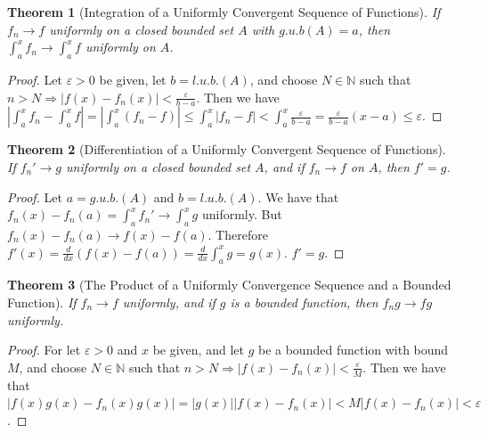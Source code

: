 \documentclass[12pt,oneside]{book}
\theoremstyle{mystyle}
\newtheorem{theorem}{Theorem}[section]
\begin{document}
\begin{theorem}[Integration of a Uniformly Convergent Sequence of Functions] If $f_n\rightarrow f$ uniformly on a closed bounded set $A$ with $g.u.b(A)=a$, then $\int_{a}^{x} f_n \rightarrow \int_{a}^{x} f$ uniformly on $A$.
\end{theorem}
\begin{proof}
Let $\varepsilon >0$ be given, let $b=l.u.b.(A)$, and choose $N\in\mathbb{N}$ such that $n>N\Rightarrow |f(x)-f_n(x)|<\frac{\varepsilon}{b-a}$. Then we have $|\int_{a}^{x} f_n - \int_{a}^{x} f| = |\int_{a}^{x} (f_n-f)| \leq \int_{a}^{x} |f_n-f| < \int_{a}^{x} \frac{\varepsilon}{b-a}= \frac{\varepsilon}{b-a}(x-a) \leq \varepsilon$. 
\end{proof}

\begin{theorem}[Differentiation of a Uniformly Convergent Sequence of Functions]
If $f_n'\rightarrow g$ uniformly on a closed bounded set $A$, and if $f_n \rightarrow f$ on $A$, then $f' = g$.
\end{theorem}
\begin{proof} Let $a=g.u.b.(A)$ and $b=l.u.b.(A)$. We have that $f_n(x) - f_n(a) = \int_{a}^{x}f_n' \rightarrow \int_{a}^{x}g$ uniformly. But $f_n(x)-f_n(a) \rightarrow f(x) - f(a)$. Therefore $f'(x)=\frac{d}{dx}(f(x)-f(a)) = \frac{d}{dx}\int_{a}^{x} g = g(x)$. $f' = g$.
\end{proof}

\begin{theorem}[The Product of a Uniformly Convergence Sequence and a Bounded Function]  If $f_n \rightarrow f$ uniformly, and if $g$ is a bounded function, then $f_n g \rightarrow fg$ uniformly.
\end{theorem}
\begin{proof}
For let $\varepsilon>0$ and $x$ be given, and let $g$ be a bounded function with bound $M$, and choose $N\in\mathbb{N}$ such that $n>N \Rightarrow |f(x)-f_n(x)|<\frac{\varepsilon}{M}$. Then we have that $|f(x)g(x)-f_n(x)g(x)| = |g(x)||f(x)-f_n(x)| < M|f(x)-f_n(x)| <\varepsilon$.
\end{proof}
\end{document}
